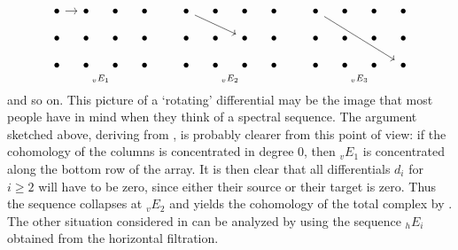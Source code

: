\[
  \underset{{}_vE_1}{
    \begin{tikzcd}[column sep=10pt, row sep=10pt, ampersand
      replacement=\&]
      \bullet \arrow[r] \& \bullet \& \bullet \& \bullet \\
      \bullet \& \bullet \& \bullet \& \bullet \\
      \bullet \& \bullet \& \bullet \& \bullet
    \end{tikzcd}} \qquad \underset{{}_vE_2}{
    \begin{tikzcd}[column sep=10pt, row sep=10pt, ampersand
      replacement=\&]
      \bullet \arrow[drr] \& \bullet \& \bullet \& \bullet \\
      \bullet \& \bullet \& \bullet \& \bullet \\
      \bullet \& \bullet \& \bullet \& \bullet
    \end{tikzcd}} \qquad \underset{{}_vE_3}{
    \begin{tikzcd}[column sep=10pt, row sep=10pt, ampersand
      replacement=\&]
      \bullet \arrow[ddrrr] \& \bullet \& \bullet \& \bullet \\
      \bullet \& \bullet \& \bullet \& \bullet \\
      \bullet \& \bullet \& \bullet \& \bullet
    \end{tikzcd}}
\]
and so on. This picture of a `rotating' differential may be the image
that most people have in mind when they think of a spectral
sequence. The argument sketched above, deriving 
from , is probably clearer from this point of
view: if the cohomology of the columns is concentrated in degree $0$,
then ${}_vE_1$ is concentrated along the bottom row of the array. It
is then clear that all differentials $d_i$ for $i \ge 2$ will have to
be zero, since either their source or their target is zero. Thus the
sequence collapses at ${}_vE_2$ and yields the cohomology of the total
complex by . The other situation considered in
 can be analyzed by using the sequence ${}_hE_i$
obtained from the horizontal filtration.

